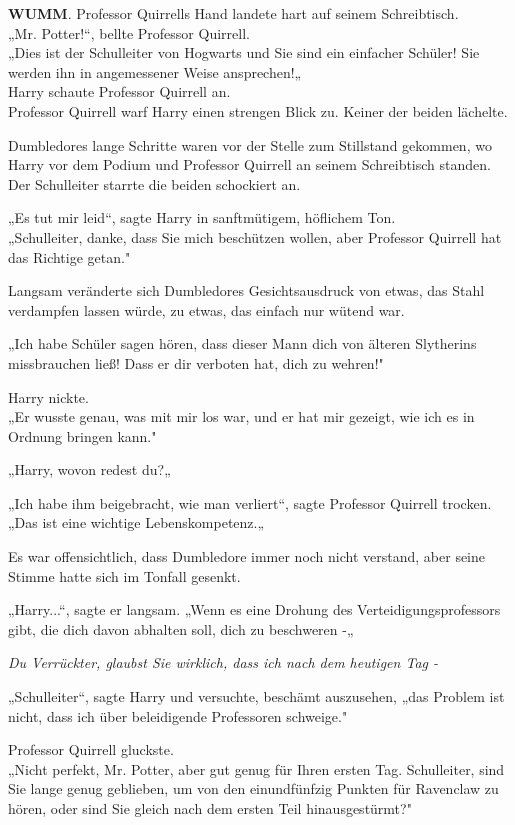 {\textbf{WUMM}. Professor Quirrells Hand landete hart auf seinem Schreibtisch.\\ „Mr. Potter!“, bellte Professor Quirrell.\\ „Dies ist der Schulleiter von Hogwarts und Sie sind ein einfacher Schüler! Sie werden ihn in angemessener Weise ansprechen!„\\ Harry schaute Professor Quirrell an.\\ Professor Quirrell warf Harry einen strengen Blick zu. Keiner der beiden lächelte.

Dumbledores lange Schritte waren vor der Stelle zum Stillstand gekommen, wo Harry vor dem Podium und Professor Quirrell an seinem Schreibtisch standen.\\ Der Schulleiter starrte die beiden schockiert an.

„Es tut mir leid“, sagte Harry in sanftmütigem, höflichem Ton.\\ „Schulleiter, danke, dass Sie mich beschützen wollen, aber Professor Quirrell hat das Richtige getan."

Langsam veränderte sich Dumbledores Gesichtsausdruck von etwas, das Stahl verdampfen lassen würde, zu etwas, das einfach nur wütend war.

„Ich habe Schüler sagen hören, dass dieser Mann dich von älteren Slytherins missbrauchen ließ! Dass er dir verboten hat, dich zu wehren!"

Harry nickte.\\ „Er wusste genau, was mit mir los war, und er hat mir gezeigt, wie ich es in Ordnung bringen kann."

„Harry, wovon redest du?„

„Ich habe ihm beigebracht, wie man verliert“, sagte Professor Quirrell trocken. „Das ist eine wichtige Lebenskompetenz.„

Es war offensichtlich, dass Dumbledore immer noch nicht verstand, aber seine Stimme hatte sich im Tonfall gesenkt.

„Harry...“, sagte er langsam. „Wenn es eine Drohung des Verteidigungsprofessors gibt, die dich davon abhalten soll, dich zu beschweren -„

\emph{Du Verrückter, glaubst Sie wirklich, dass ich nach dem heutigen Tag -}

„Schulleiter“, sagte Harry und versuchte, beschämt auszusehen, „das Problem ist nicht, dass ich über beleidigende Professoren schweige."

Professor Quirrell gluckste.\\ „Nicht perfekt, Mr. Potter, aber gut genug für Ihren ersten Tag. Schulleiter, sind Sie lange genug geblieben, um von den einundfünfzig Punkten für Ravenclaw zu hören, oder sind Sie gleich nach dem ersten Teil hinausgestürmt?"

}
